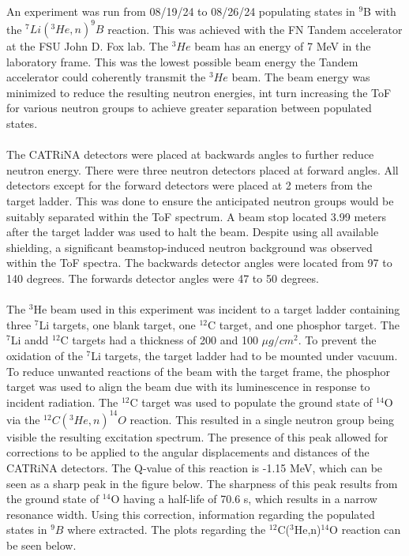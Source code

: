\documentclass[11pt,copyright]{fsuthesis}
\begin{document}
An experiment was run from 08/19/24 to 08/26/24 populating states in $^9$B with the $^7Li(^3He,n)^9B$ reaction. This was achieved with the FN Tandem accelerator at the FSU John D. Fox lab. The $^3He$ beam has an energy of 7 MeV in  the laboratory frame. This was the lowest possible beam energy the Tandem accelerator could coherently transmit the $^3He$ beam. The beam energy was minimized to reduce the resulting neutron energies, int turn increasing the ToF for various neutron groups to achieve greater separation between populated states.
\\ \\
The CATRiNA detectors were placed at backwards angles to further reduce neutron energy. There were three neutron detectors placed at forward angles. All detectors except for the forward detectors were placed at 2 meters from the target ladder. This was done to ensure the anticipated neutron groups would be suitably separated within the ToF spectrum. A beam stop located 3.99 meters after the target ladder was used to halt the beam. Despite using all available shielding, a significant beamstop-induced neutron background was observed within the ToF spectra. The backwards detector angles were located from 97 to 140 degrees. The forwards detector angles were 47 to 50 degrees. 
\\ \\
The $^3$He beam used in this experiment was incident to a target ladder containing three $^7$Li targets, one blank target, one $^{12}$C target, and one phosphor target. The $^7$Li andd $^{12}$C targets had a thickness of 200 and 100 $\mu g/cm^2$. To prevent the oxidation of the $^7$Li targets, the target ladder had to be mounted under vacuum. To reduce unwanted reactions of the beam with the target frame, the phosphor target was used to align the beam due with its luminescence in response to incident radiation. The $^{12}$C target was used to populate the ground state of $^{14}$O via the $^{12}C(^3He,n)^{14}O$ reaction. This resulted in a single neutron group being visible the resulting excitation spectrum. The presence of this peak allowed for corrections to be applied to the angular displacements and distances of the CATRiNA detectors. The Q-value of this reaction is -1.15 MeV, which can be seen as a sharp peak in the figure below. The sharpness of this peak results from the ground state of $^{14}$O having a half-life of 70.6 s, which results in a narrow resonance width. Using this correction, information regarding the populated states in $^{9}B$ where extracted. The plots regarding the $^{12}$C($^3$He,n)$^{14}$O reaction can be seen below. 
\end{document}
